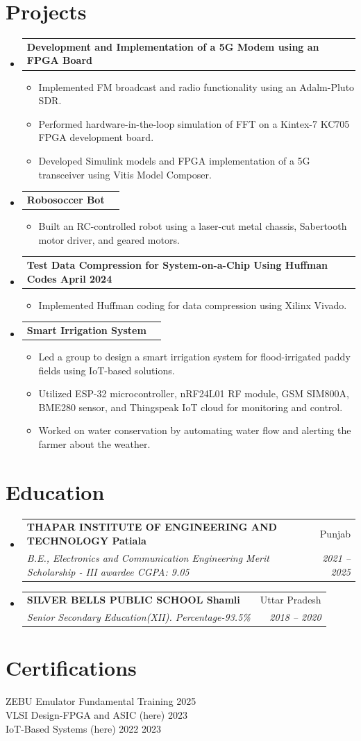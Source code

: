 \documentclass[letterpaper,11pt]{article}
\makeatletter
\newcommand{\resumeItem}[1]{\item\small{#1 \vspace{-2pt}}}
\newcommand{\resumeSubheading}[4]{
  \vspace{-2pt}\item
    \begin{tabular*}{\textwidth}[t]{l@{\extracolsep{\fill}}r}
      \textbf{#1} & #2 \\
      \textit{\small#3} & \textit{\small #4} \\
    \end{tabular*}\vspace{-7pt}
}
\newcommand{\resumeProjectHeading}[2]{
    \item
    \begin{tabular*}{\textwidth}{l@{\extracolsep{\fill}}r}
      \small#1 & #2 \\
    \end{tabular*}\vspace{-7pt}
}
\newcommand{\resumeSubHeadingListStart}{\begin{itemize}[leftmargin=0.15in, label={}]}
\newcommand{\resumeSubHeadingListEnd}{\end{itemize}}
\newcommand{\resumeItemListStart}{\begin{itemize}}
\newcommand{\resumeItemListEnd}{\end{itemize}\vspace{-5pt}}
\makeatother
\begin{document}
\section{Projects}
\resumeSubHeadingListStart
  \resumeProjectHeading
    {\textbf{ Development and Implementation of a 5G Modem using an FPGA Board }}{  }
    \resumeItemListStart
      \resumeItem{ Implemented FM broadcast and radio functionality using an Adalm-Pluto SDR. }
      \resumeItem{ Performed hardware-in-the-loop simulation of FFT on a Kintex-7 KC705 FPGA development board. }
      \resumeItem{ Developed Simulink models and FPGA implementation of a 5G transceiver using Vitis Model Composer. }
    \resumeItemListEnd
  \resumeProjectHeading
    {\textbf{ Robosoccer Bot }}{  }
    \resumeItemListStart
      \resumeItem{ Built an RC-controlled robot using a laser-cut metal chassis, Sabertooth motor driver, and geared motors. }
    \resumeItemListEnd
  \resumeProjectHeading
    {\textbf{ Test Data Compression for System-on-a-Chip Using Huffman Codes April 2024 }}{  }
    \resumeItemListStart
      \resumeItem{ Implemented Huffman coding for data compression using Xilinx Vivado. }
    \resumeItemListEnd
  \resumeProjectHeading
    {\textbf{ Smart Irrigation System }}{  }
    \resumeItemListStart
      \resumeItem{ Led a group to design a smart irrigation system for flood-irrigated paddy fields using IoT-based solutions. }
      \resumeItem{ Utilized ESP-32 microcontroller, nRF24L01 RF module, GSM SIM800A, BME280 sensor, and Thingspeak IoT cloud for monitoring and control. }
      \resumeItem{ Worked on water conservation by automating water flow and alerting the farmer about the weather. }
    \resumeItemListEnd
\resumeSubHeadingListEnd

\section{Education}
\resumeSubHeadingListStart
  \resumeSubheading
    { THAPAR INSTITUTE OF ENGINEERING AND TECHNOLOGY Patiala }{ Punjab }
    { B.E., Electronics and Communication Engineering \textbar{} Merit Scholarship - III awardee \textbar{} CGPA: 9.05 }
    { 2021 -- 2025 }
  \resumeSubheading
    { SILVER BELLS PUBLIC SCHOOL Shamli }{ Uttar Pradesh }
    { Senior Secondary Education(XII). Percentage-93.5\% }
    { 2018 -- 2020 }
\resumeSubHeadingListEnd

\section{Certifications}
\begin{itemize}[leftmargin=0.15in, label={}]
  \small{\item{
    ZEBU Emulator Fundamental Training 2025 \\
    VLSI Design-FPGA and ASIC (here) 2023 \\
    IoT-Based Systems (here) 2022 2023 \\
  }}
\end{itemize}
\end{document}
